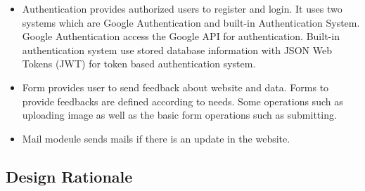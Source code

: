 \begin{itemize}
  \item Authentication provides authorized users to register and login. It uses two systems which are Google Authentication and built-in Authentication System.
  \subitem Google Authentication access the Google API for authentication. Built-in authentication system use stored database information with JSON Web Tokens (JWT) for token based authentication system.
  \item Form provides user to send feedback about website and data. Forms to provide feedbacks are defined according to needs. Some operations such as uploading image as well as the basic form operations such as submitting.
  \item Mail modeule sends mails if there is an update in the website.
\end{itemize}

\subsection{Design Rationale}
